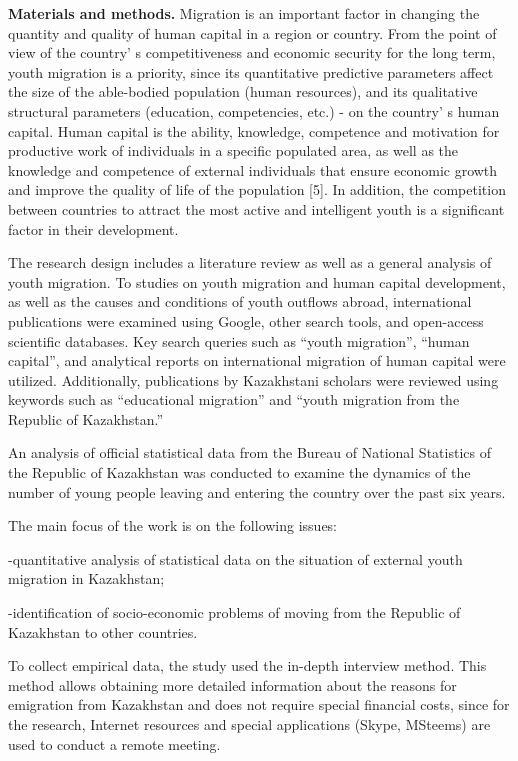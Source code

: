 \begin{multicols}{2}
{\bfseries Materials and methods.} Migration is an important factor in
changing the quantity and quality of human capital in a region or
country. From the point of view of the country' s
competitiveness and economic security for the long term, youth migration
is a priority, since its quantitative predictive parameters affect the
size of the able-bodied population (human resources), and its
qualitative structural parameters (education, competencies, etc.) - on
the country' s human capital. Human capital is the
ability, knowledge, competence and motivation for productive work of
individuals in a specific populated area, as well as the knowledge and
competence of external individuals that ensure economic growth and
improve the quality of life of the population {[}5{]}. In addition, the
competition between countries to attract the most active and intelligent
youth is a significant factor in their development.

The research design includes a literature review as well as a general
analysis of youth migration. To studies on youth migration and human
capital development, as well as the causes and conditions of youth
outflows abroad, international publications were examined using Google,
other search tools, and open-access scientific databases. Key search
queries such as ``youth migration'', ``human capital'', and analytical
reports on international migration of human capital were utilized.
Additionally, publications by Kazakhstani scholars were reviewed using
keywords such as ``educational migration'' and ``youth migration from
the Republic of Kazakhstan.''

An analysis of official statistical data from the Bureau of National
Statistics of the Republic of Kazakhstan was conducted to examine the
dynamics of the number of young people leaving and entering the country
over the past six years.

The main focus of the work is on the following issues:

-quantitative analysis of statistical data on the situation of external
youth migration in Kazakhstan;

-identification of socio-economic problems of moving from the Republic
of Kazakhstan to other countries.

To collect empirical data, the study used the in-depth interview method.
This method allows obtaining more detailed information about the reasons
for emigration from Kazakhstan and does not require special financial
costs, since for the research, Internet resources and special
applications (Skype, MSteems) are used to conduct a remote meeting.


\end{multicols}
